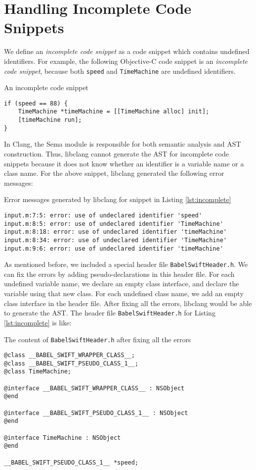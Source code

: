\documentclass{sfuthesis}
\begin{document}
\section{Handling Incomplete Code Snippets}

We define an \emph{incomplete code snippet} as a code snippet which contains undefined identifiers. For example, the following Objective-C code snippet is an \emph{incomplete code snippet}, because both \texttt{speed} and \texttt{TimeMachine} are undefined identifiers.

\begin{listing}[H]
\caption{An incomplete code snippet}
\label{lst:incomplete}
\begin{verbatim}
if (speed == 88) {
    TimeMachine *timeMachine = [[TimeMachine alloc] init];
    [timeMachine run];
}
\end{verbatim}
\end{listing}

In Clang, the Sema module is responsible for both semantic analysis and AST construction. Thus, libclang cannot generate the AST for incomplete code snippets because it does not know whether an identifier is a variable name or a class name. For the above snippet, libclang generated the following error messages:

\begin{listing}
\caption{Error messages generated by libclang for snippet in Listing \ref{lst:incomplete}}
\begin{verbatim}
input.m:7:5: error: use of undeclared identifier 'speed'
input.m:8:5: error: use of undeclared identifier 'TimeMachine'
input.m:8:18: error: use of undeclared identifier 'timeMachine'
input.m:8:34: error: use of undeclared identifier 'TimeMachine'
input.m:9:6: error: use of undeclared identifier 'timeMachine'
\end{verbatim}
\end{listing}

As mentioned before, we included a special header file \texttt{BabelSwiftHeader.h}. We can fix the errors by adding pseudo-declarations in this header file. For each undefined variable name, we declare an empty class interface, and declare the variable using that new class. For each undefined class name, we add an empty class interface in the header file. After fixing all the errors, libclang would be able to generate the AST. The header file \texttt{BabelSwiftHeader.h} for Listing \ref{lst:incomplete} is like:

\begin{listing}[H]
\caption{The content of \texttt{BabelSwiftHeader.h} after fixing all the errors}
\begin{verbatim}
@class __BABEL_SWIFT_WRAPPER_CLASS__;
@class __BABEL_SWIFT_PSEUDO_CLASS_1__;
@class TimeMachine;

@interface __BABEL_SWIFT_WRAPPER_CLASS__ : NSObject
@end

@interface __BABEL_SWIFT_PSEUDO_CLASS_1__ : NSObject
@end

@interface TimeMachine : NSObject
@end

__BABEL_SWIFT_PSEUDO_CLASS_1__ *speed;
\end{verbatim}
\end{listing}
\end{document}
